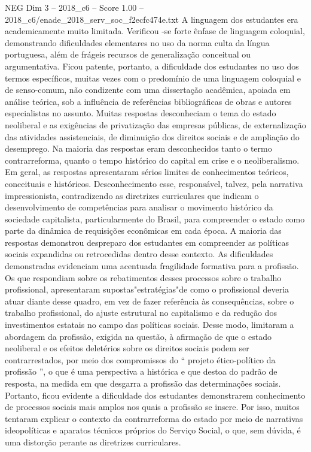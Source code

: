 \begin{textsample}{NEG Dim 3 – 2018\_c6 – Score 1.00 – 2018\_c6/enade\_2018\_serv\_soc\_f2ecfc474e.txt}
A linguagem dos estudantes era academicamente muito limitada.
Verificou -se forte ênfase de linguagem coloquial, demonstrando dificuldades elementares no uso da norma culta da língua portuguesa, além de frágeis recursos de generalização conceitual ou argumentativa.
Ficou patente, portanto, a dificuldade dos estudantes no uso dos termos específicos, muitas vezes com o predomínio de uma linguagem coloquial e de senso-comum, não condizente com uma dissertação acadêmica, apoiada em análise teórica, sob a influência de referências bibliográficas de obras e autores especialistas no assunto.
Muitas respostas desconheciam o tema do estado neoliberal e as exigências de privatização das empresas públicas, de externalização das atividades assistenciais, de diminuição dos direitos sociais e de ampliação do desemprego.
Na maioria das respostas eram desconhecidos tanto o termo contrarreforma, quanto o tempo histórico do capital em crise e o neoliberalismo.
Em geral, as respostas apresentaram sérios limites de conhecimentos teóricos, conceituais e históricos.
Desconhecimento esse, responsável, talvez, pela narrativa impressionista, contradizendo as diretrizes curriculares que indicam o desenvolvimento de competências para analisar o movimento histórico da sociedade capitalista, particularmente do Brasil, para compreender o estado como parte da dinâmica de requisições econômicas em cada época.
A maioria das respostas demonstrou despreparo dos estudantes em compreender as políticas sociais expandidas ou retrocedidas dentro desse contexto.
As dificuldades demonstradas evidenciam uma acentuada fragilidade formativa para a profissão.
Os que respondiam sobre os rebatimentos desses processos sobre o trabalho profissional, apresentaram supostas"estratégias"de como o profissional deveria atuar diante desse quadro, em vez de fazer referência às consequências, sobre o trabalho profissional, do ajuste estrutural no capitalismo e da redução dos investimentos estatais no campo das políticas sociais.
Desse modo, limitaram a abordagem da profissão, exigida na questão, à afirmação de que o estado neoliberal e os efeitos deletérios sobre os direitos sociais podem ser contrarrestados, por meio dos compromissos do “ projeto ético-político da profissão ”, o que é uma perspectiva a histórica e que destoa do padrão de resposta, na medida em que desgarra a profissão das determinações sociais.
Portanto, ficou evidente a dificuldade dos estudantes demonstrarem conhecimento de processos sociais mais amplos nos quais a profissão se insere.
Por isso, muitos tentaram explicar o contexto da contrarreforma do estado por meio de narrativas ideopolíticas e aparatos técnicos próprios do Serviço Social, o que, sem dúvida, é uma distorção perante as diretrizes curriculares.

\end{textsample}
